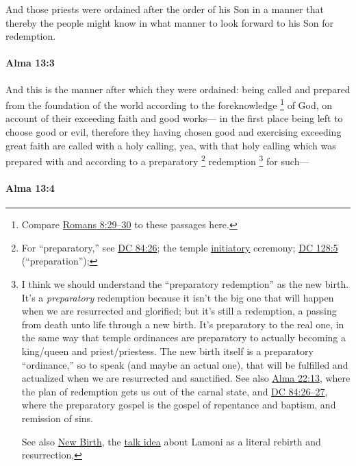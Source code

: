 			And those priests were ordained after the order of his Son
			in a manner that thereby the people might know
			in what manner to look forward to his Son for redemption.

		\paragraph{Alma 13:3} %
			\label{ALMA-13-3}

			And this is the manner after which they were ordained:
			being called and prepared from the foundation of the world
			according to the foreknowledge%
			\footnote{%
				Compare \hyperref[ROMANS-8-29]{Romans 8:29--30} to these passages here.
				}
			of God,
			on account of their exceeding faith and good works---
			in the first place being left to choose good or evil,
			therefore they having chosen good and exercising exceeding great faith
			are called with a holy calling,
			yea, with that holy calling which was prepared
			with and according to a preparatory%
				\footnote{%
					For ``preparatory,'' see \hyperref[DC84-26]{DC 84:26}; the temple \hyperref[TEMPLE-ENDOWMENT-INIT-PRE-2005-WASH]{initiatory} ceremony; \hyperref[DC128-5]{DC 128:5} (``preparation''); 
					}
			redemption%
				\footnote{%
					I think we should understand the ``preparatory redemption'' as the new birth. It's a \textit{preparatory} redemption because it isn't the big one that will happen when we are resurrected and glorified; but it's still a redemption, a passing from death unto life through a new birth. It's preparatory to the real one, in the same way that temple ordinances are preparatory to actually becoming a king/queen and priest/priestess. The new birth itself is a preparatory ``ordinance,'' so to speak (and maybe an actual one), that will be fulfilled and actualized when we are resurrected and sanctified. See also \hyperref[ALMA-22-13]{Alma 22:13}, where the plan of redemption gets us out of the carnal state, and \hyperref[DC84-26]{DC 84:26--27}, where the preparatory gospel is the gospel of repentance and baptism, and remission of sins.
					
					See also \hyperref[NEWBIRTH]{New Birth}, the \hyperref[TALKIDEAS]{talk idea} about Lamoni as a literal rebirth and resurrection,
					}
			for such---

		\paragraph{Alma 13:4} %
			\label{ALMA-13-4}

